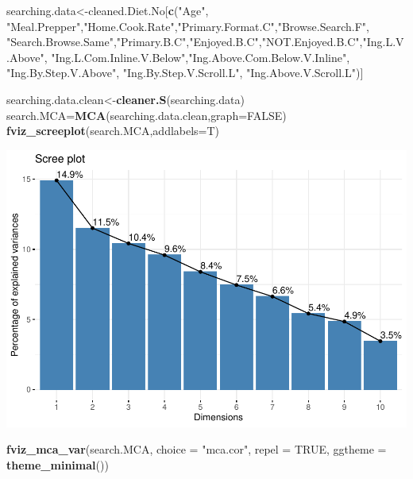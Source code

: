 \documentclass[
]{article}
\newenvironment{Shaded}{\begin{snugshade}}{\end{snugshade}}
\newcommand{\DataTypeTok}[1]{\textcolor[rgb]{0.13,0.29,0.53}{#1}}
\newcommand{\KeywordTok}[1]{\textcolor[rgb]{0.13,0.29,0.53}{\textbf{#1}}}
\newcommand{\NormalTok}[1]{#1}
\newcommand{\OtherTok}[1]{\textcolor[rgb]{0.56,0.35,0.01}{#1}}
\newcommand{\StringTok}[1]{\textcolor[rgb]{0.31,0.60,0.02}{#1}}
\begin{document}
\begin{Shaded}
\begin{Highlighting}[]
\NormalTok{searching.data<-cleaned.Diet.No[}\KeywordTok{c}\NormalTok{(}\StringTok{"Age"}\NormalTok{, }\StringTok{"Meal.Prepper"}\NormalTok{,}\StringTok{"Home.Cook.Rate"}\NormalTok{,}\StringTok{"Primary.Format.C"}\NormalTok{,}\StringTok{"Browse.Search.F"}\NormalTok{,}
            \StringTok{"Search.Browse.Same"}\NormalTok{,}\StringTok{"Primary.B.C"}\NormalTok{,}\StringTok{"Enjoyed.B.C"}\NormalTok{,}\StringTok{"NOT.Enjoyed.B.C"}\NormalTok{,}\StringTok{"Ing.L.V.Above"}\NormalTok{,}
            \StringTok{"Ing.L.Com.Inline.V.Below"}\NormalTok{,}\StringTok{"Ing.Above.Com.Below.V.Inline"}\NormalTok{,  }\StringTok{"Ing.By.Step.V.Above"}\NormalTok{,  }\StringTok{"Ing.By.Step.V.Scroll.L"}\NormalTok{,}
            \StringTok{"Ing.Above.V.Scroll.L"}\NormalTok{)]}

\NormalTok{searching.data.clean<-}\KeywordTok{cleaner.S}\NormalTok{(searching.data)}
\NormalTok{search.MCA=}\KeywordTok{MCA}\NormalTok{(searching.data.clean,}\DataTypeTok{graph=}\OtherTok{FALSE}\NormalTok{)}
\KeywordTok{fviz_screeplot}\NormalTok{(search.MCA,}\DataTypeTok{addlabels=}\NormalTok{T)}
\end{Highlighting}
\end{Shaded}

\includegraphics{Average-User-MCA_files/figure-latex/diet no browse-1.pdf}

\begin{Shaded}
\begin{Highlighting}[]
\KeywordTok{fviz_mca_var}\NormalTok{(search.MCA, }\DataTypeTok{choice =} \StringTok{"mca.cor"}\NormalTok{, }\DataTypeTok{repel =} \OtherTok{TRUE}\NormalTok{,}
             \DataTypeTok{ggtheme =} \KeywordTok{theme_minimal}\NormalTok{())}
\end{Highlighting}
\end{Shaded}
\end{document}
